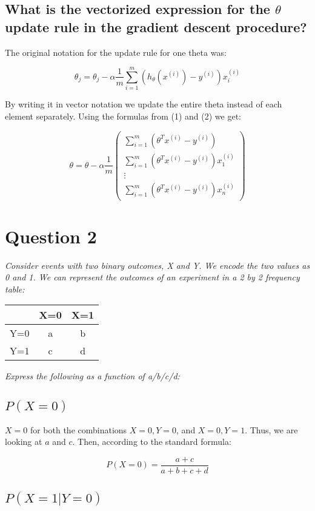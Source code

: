 \documentclass{article}
\begin{document}
\subsection{What is the vectorized expression for the $\theta$ update rule in the gradient descent procedure?}
The original notation for the update rule for one theta was:

\begin{equation*}
\theta_j = \theta_j - \alpha \frac{1}{m}  \sum\limits_{i=1}^m (h _{\theta} (x ^{(i)}) - y ^{(i)})x_i^{(i)}
\end{equation*}

By writing it in vector notation we update the entire theta instead of each element separately. Using the formulas from (1) and (2) we get:

\begin{equation*}
\theta = \theta - \alpha \frac{1}{m}\begin{pmatrix}	\sum\limits_{i=1}^m ( \theta^T x^{(i)}  - y ^{(i)})\\ 
									     		\sum\limits_{i=1}^m ( \theta^T x^{(i)}  - y ^{(i)})x_1^{(i)} \\ 
										      	 \vdots \\
										 	\sum\limits_{i=1}^m ( \theta^T x^{(i)}  - y ^{(i)})x_n^{(i)}
						\end{pmatrix}
\end{equation*}




\pagebreak

\section{Question 2}
\textit{Consider events with two binary outcomes, X and Y. We encode the two values as 0 and 1. We can represent
the outcomes of an experiment in a 2 by 2 frequency table:}

\begin{table}[h!]
\centering
\begin{tabular}{c|c c}
~ & X=0 & X=1 \\
\hline
Y=0 & a & b \\
Y=1 & c & d \\
\end{tabular}
\end{table}

\textit{Express the following as a function of a/b/c/d:}

\subsection{$P(X=0)$}
$X=0$ for both the combinations $ X=0, Y=0$, and $X=0, Y=1$. Thus, we are looking at $a$ and $c$. Then, according to the standard formula:

\begin{equation*}
P(X=0) = \frac{a + c}{a+b+c+d}
\end{equation*}

\subsection{$P(X=1|Y=0)$}
\end{document}
